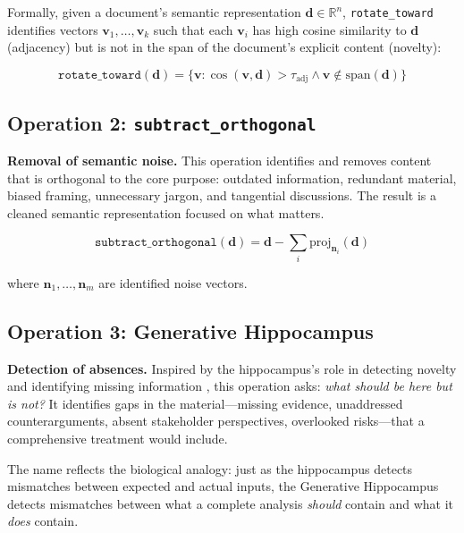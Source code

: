 \documentclass[11pt,a4paper]{article}
\begin{document}
Formally, given a document's semantic representation $\mathbf{d} \in \mathbb{R}^n$, \texttt{rotate\_toward} identifies vectors $\mathbf{v}_1, \ldots, \mathbf{v}_k$ such that each $\mathbf{v}_i$ has high cosine similarity to $\mathbf{d}$ (adjacency) but is not in the span of the document's explicit content (novelty):

\begin{equation}
    \texttt{rotate\_toward}(\mathbf{d}) = \{\mathbf{v} : \cos(\mathbf{v}, \mathbf{d}) > \tau_{\text{adj}} \land \mathbf{v} \notin \text{span}(\mathbf{d})\}
\end{equation}

\subsection{Operation 2: \texttt{subtract\_orthogonal}}

\textbf{Removal of semantic noise.} This operation identifies and removes content that is orthogonal to the core purpose: outdated information, redundant material, biased framing, unnecessary jargon, and tangential discussions. The result is a cleaned semantic representation focused on what matters.

\begin{equation}
    \texttt{subtract\_orthogonal}(\mathbf{d}) = \mathbf{d} - \sum_{i} \text{proj}_{\mathbf{n}_i}(\mathbf{d})
\end{equation}

\noindent where $\mathbf{n}_1, \ldots, \mathbf{n}_m$ are identified noise vectors.

\subsection{Operation 3: Generative Hippocampus}

\textbf{Detection of absences.} Inspired by the hippocampus's role in detecting novelty and identifying missing information \citep{kumaran2006hippocampus}, this operation asks: \emph{what should be here but is not?} It identifies gaps in the material---missing evidence, unaddressed counterarguments, absent stakeholder perspectives, overlooked risks---that a comprehensive treatment would include.

The name reflects the biological analogy: just as the hippocampus detects mismatches between expected and actual inputs, the Generative Hippocampus detects mismatches between what a complete analysis \emph{should} contain and what it \emph{does} contain.
\end{document}
